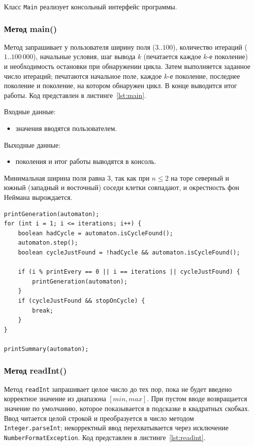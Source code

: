 Класс \texttt{Main} реализует консольный интерфейс программы.

\subsubsection*{Метод main()}

Метод запрашивает у пользователя ширину поля ($3..100$), количество итераций ($1..100\,000$), начальные условия, шаг вывода $k$ (печатается каждое $k$-е поколение) и необходимость остановки при обнаружении цикла. Затем выполняется заданное число итераций; печатаются начальное поле, каждое $k$-е поколение, последнее поколение и поколение, на котором обнаружен цикл. В конце выводится итог работы. Код представлен в листинге~\ref{lst:main}.

Входные данные:
\begin{itemize}
	\item значения вводятся пользователем.
\end{itemize}

Выходные данные:
\begin{itemize}
	\item поколения и итог работы выводятся в консоль.
\end{itemize}

Минимальная ширина поля равна 3, так как при $n \le 2$ на торе северный и южный (западный и восточный) соседи клетки совпадают, и окрестность фон Неймана вырождается.

\begin{lstlisting}[caption={Основной цикл метода main()}, label={lst:main}]
printGeneration(automaton);
for (int i = 1; i <= iterations; i++) {
	boolean hadCycle = automaton.isCycleFound();
	automaton.step();
	boolean cycleJustFound = !hadCycle && automaton.isCycleFound();

	if (i % printEvery == 0 || i == iterations || cycleJustFound) {
		printGeneration(automaton);
	}
	if (cycleJustFound && stopOnCycle) {
		break;
	}
}

printSummary(automaton);
\end{lstlisting}

\subsubsection*{Метод readInt()}

Метод \texttt{readInt} запрашивает целое число до тех пор, пока не будет введено корректное значение из диапазона $[min, max]$. При пустом вводе возвращается значение по умолчанию, которое показывается в подсказке в квадратных скобках. Ввод читается целой строкой и преобразуется в число методом \texttt{Integer.parseInt}; некорректный ввод перехватывается через исключение \texttt{NumberFormatException}. Код представлен в листинге~\ref{lst:readint}.

